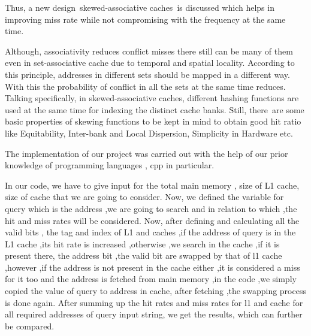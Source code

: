 \documentclass[12pt]{article}
\begin{document}
{\fontsize{16pt}{19.2pt}\selectfont Thus, a new design skewed-associative caches is discussed which helps in improving miss rate while not compromising with the frequency at the same time.\par}\par

{\fontsize{16pt}{19.2pt}\selectfont Although, associativity reduces conflict misses there still can be many of them even in set-associative cache due to temporal and spatial locality. According to this principle, addresses in different sets should be mapped in a different way. With this the probability of conflict in all the sets at the same time reduces. Talking specifically, in skewed-associative caches, different hashing functions are used at the same time for indexing the distinct cache banks. Still, there\ are some basic properties of skewing functions to be kept in mind to obtain good hit ratio like Equitability, Inter-bank and Local Dispersion, Simplicity in Hardware etc.   \par}\par

{\fontsize{18pt}{21.6pt}\par}\par

{\fontsize{16pt}{19.2pt}\selectfont The implementation of our project was carried out with the help of our prior knowledge of programming languages , cpp in particular.\par}\par

{\fontsize{16pt}{19.2pt}\selectfont In our code, we have to give input for the total main memory , size of L1 cache, size of cache that we are going to consider. Now, we defined the variable for query which is the address ,we are going to search and in relation to which ,the hit and miss rates will be considered. Now, after defining and calculating all the valid bits , the tag and index of L1 and caches ,if the address of query is in the L1 cache ,its hit rate is increased ,otherwise ,we search in the cache ,if it is present there, the address bit ,the valid bit are swapped by that of l1 cache ,however ,if the address is not present in the cache either ,it is considered a miss for it too and the address is fetched from main memory ,in the code ,we simply copied the value of query to address in cache, after fetching ,the swapping process is done again. After summing up the hit rates and miss rates for l1 and cache for all required addresses of query input string, we get the results, which can further be compared.\par}\par
\end{document}
